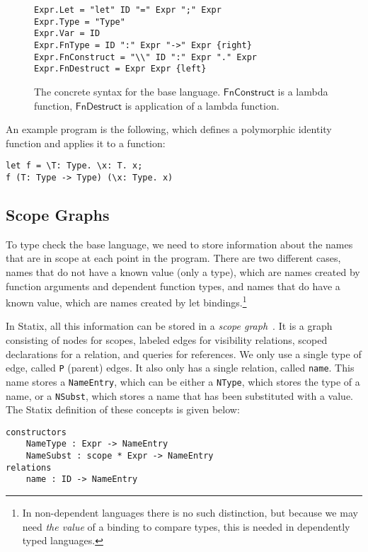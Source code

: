 \documentclass[a4paper,UKenglish,cleveref, autoref, thm-restate]{oasics-v2021}
\newcommand{\co}[1]{ \mathsf{#1} }
\begin{document}
\begin{figure}[h]
\begin{lstlisting}
Expr.Let = "let" ID "=" Expr ";" Expr
Expr.Type = "Type"
Expr.Var = ID
Expr.FnType = ID ":" Expr "->" Expr {right}
Expr.FnConstruct = "\\" ID ":" Expr "." Expr
Expr.FnDestruct = Expr Expr {left}
\end{lstlisting}
\caption{The concrete syntax for the base language. $\co{FnConstruct}$ is a lambda function, $\co{FnDestruct}$ is application of a lambda function.}
\label{fig:syntax}
\end{figure}

An example program is the following, which defines a polymorphic identity function and applies it to a function:

\begin{lstlisting}
let f = \T: Type. \x: T. x;
f (T: Type -> Type) (\x: Type. x)
\end{lstlisting}

\subsection{Scope Graphs}
\label{sec:coc-scopes}

To type check the base language, we need to store information about the names that are in scope at each point in the program. There are two different cases, names that do not have a known value (only a type), which are names created by function arguments and dependent function types, and names that do have a known value, which are names created by let bindings.\footnote{In non-dependent languages there is no such distinction, but because we may need \emph{the value} of a binding to compare types, this is needed in dependently typed languages.}

In Statix, all this information can be stored in a \emph{scope graph}~\cite{scope_graphs}. It is a graph consisting of nodes for scopes, labeled edges for visibility relations, scoped declarations for a relation, and queries for references. We only use a single type of edge, called \verb|P| (parent) edges. It also only has a single relation, called \verb|name|. This name stores a \verb|NameEntry|, which can be either a \verb|NType|, which stores the type of a name, or a \verb|NSubst|, which stores a name that has been substituted with a value. The Statix definition of these concepts is given below: 
\begin{lstlisting}
constructors
    NameType : Expr -> NameEntry
    NameSubst : scope * Expr -> NameEntry
relations
    name : ID -> NameEntry
\end{lstlisting}
\end{document}
